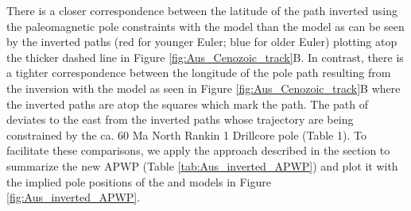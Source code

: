 \documentclass[11pt,letterpaper]{article}
\begin{document}
There is a closer correspondence between the latitude of the path inverted using the paleomagnetic pole constraints with the \cite{Muller2016a} model than the \cite{Torsvik2017a} model as can be seen by the inverted paths (red for younger Euler; blue for older Euler) plotting atop the thicker dashed line in Figure \ref{fig:Aus_Cenozoic_track}B. In contrast, there is a tighter correspondence between the longitude of the pole path resulting from the inversion with the \cite{Torsvik2017a} model as seen in Figure \ref{fig:Aus_Cenozoic_track}B where the inverted paths are atop the squares which mark the \cite{Torsvik2017a} path. The path of \cite{Muller2016a} deviates to the east from the inverted paths whose trajectory are being constrained by the ca. 60 Ma North Rankin 1 Drillcore pole (Table 1). To facilitate these comparisons, we apply the approach described in the  section to summarize the new APWP (Table \ref{tab:Aus_inverted_APWP}) and plot it with the implied pole positions of the \cite{Muller2016a} and \cite{Torsvik2017a} models in Figure \ref{fig:Aus_inverted_APWP}.
\end{document}
